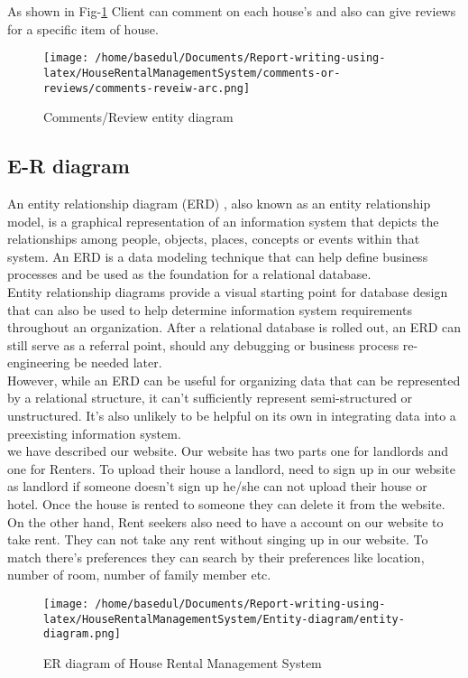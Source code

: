 \documentclass[12pt,a4paper]{report}
\newcommand\tab[1][0cm]{\hspace*{#1}}
\begin{document}
	{As shown in Fig-\ref{fig:commentsent} Client can comment on each house's and also can give reviews for a specific item of house.} 
	\begin{figure}[H]
		\centering
		\texttt{[image: /home/basedul/Documents/Report-writing-using-latex/HouseRentalManagementSystem/comments-or-reviews/comments-reveiw-arc.png]}
		\caption{\hspace{0.35em}Comments/Review entity diagram}
		\label{fig:commentsent} 
	\end{figure}
	
	\subsection{E-R diagram}
		\tab An entity relationship diagram (ERD) \cite{Ref:14}, also known as an entity relationship model, is a graphical representation of an information system that depicts the relationships among people, objects, places, concepts or events within that system. An ERD is a data modeling technique that can help define business processes and be used as the foundation for a relational database.\\Entity relationship diagrams provide a visual starting point for database design that can also be used to help determine information system requirements throughout an organization. After a relational database is rolled out, an ERD can still serve as a referral point, should any debugging or business process re-engineering be needed later.\\However, while an ERD can be useful for organizing data that can be represented by a relational structure, it can't sufficiently represent semi-structured or unstructured. It's also unlikely to be helpful on its own in integrating data into a preexisting information system.\\we have described our website. Our website has two parts one for landlords and one
for Renters. To upload their house a landlord, need to sign up in our website as landlord if
someone doesn’t sign up he/she can not upload their house or hotel. Once the house is rented to
someone they can delete it from the website.
On the other hand, Rent seekers also need to have a account on our website to take rent. They can
not take any rent without singing up in our website. To match there’s preferences they can search
by their preferences like location, number of room, number of family member etc.
	
		\begin{figure}[H]
		\centering
		\texttt{[image: /home/basedul/Documents/Report-writing-using-latex/HouseRentalManagementSystem/Entity-diagram/entity-diagram.png]}
		\caption{\hspace{0.35em}ER diagram of House Rental Management System}
		\label{fig:erdig} 
	\end{figure}
	
\end{document}
